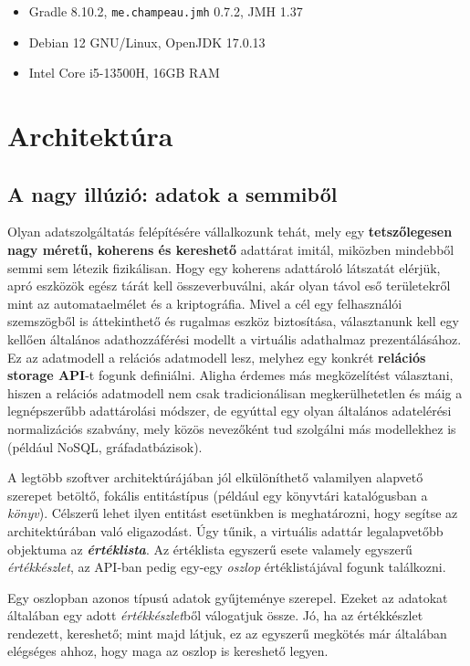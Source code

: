 \documentclass[
    parspace,
    noindent,
    nohyp,
]{elteiktdk}[2023/04/10]
\begin{document}
\begin{itemize}
    \item Gradle 8.10.2, \texttt{me.champeau.jmh} 0.7.2, JMH 1.37
    \item Debian 12 GNU/Linux, OpenJDK 17.0.13
    \item Intel Core i5-13500H, 16GB RAM
\end{itemize}


\chapter{Architektúra}

\section{A nagy illúzió: adatok a semmiből}

Olyan adatszolgáltatás felépítésére vállalkozunk tehát,
mely egy \textbf{tetszőlegesen nagy méretű, koherens és kereshető} adattárat imitál,
miközben mindebből semmi sem létezik fizikálisan.
Hogy egy koherens adattároló látszatát elérjük,
apró eszközök egész tárát kell összeverbuválni,
akár olyan távol eső területekről mint az automataelmélet és a kriptográfia.
Mivel a cél egy felhasználói szemszögből is áttekinthető és rugalmas eszköz biztosítása,
választanunk kell egy kellően általános adathozzáférési modellt a virtuális adathalmaz prezentálásához.
Ez az adatmodell a relációs adatmodell lesz,
melyhez egy konkrét \textbf{relációs storage API}-t fogunk definiálni.
Aligha érdemes más megközelítést választani,
hiszen a relációs adatmodell nem csak tradicionálisan megkerülhetetlen
és máig a legnépszerűbb adattárolási módszer\cite{DBEngines2024RankingModels},
de egyúttal egy olyan általános adatelérési normalizációs szabvány,
mely közös nevezőként tud szolgálni más modellekhez is (például NoSQL, gráfadatbázisok).

A legtöbb szoftver architektúrájában jól elkülöníthető valamilyen
alapvető szerepet betöltő, fokális entitástípus
(például egy könyvtári katalógusban a \textit{könyv}).
Célszerű lehet ilyen entitást esetünkben is meghatározni,
hogy segítse az architektúrában való eligazodást.
Úgy tűnik, a virtuális adattár legalapvetőbb objektuma az \textbf{\textit{értéklista}}.
Az értéklista egyszerű esete valamely egyszerű \textit{értékkészlet},
az API-ban pedig egy-egy \textit{oszlop} értéklistájával fogunk találkozni.

Egy oszlopban azonos típusú adatok gyűjteménye szerepel.
Ezeket az adatokat általában egy adott \textit{értékkészlet}ből válogatjuk össze.
Jó, ha az értékkészlet rendezett, kereshető;
mint majd látjuk, ez az egyszerű megkötés már általában elégséges ahhoz,
hogy maga az oszlop is kereshető legyen.
\end{document}
